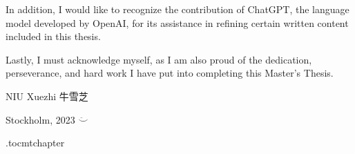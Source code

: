 In addition, I would like to recognize the contribution of ChatGPT, the language model developed by OpenAI, for its assistance in refining certain written content included in this thesis.

Lastly, I must acknowledge myself, as I am also proud of the dedication, perseverance, and hard work I have put into completing this Master's Thesis.

\vspace{2cm}
\hfill NIU Xuezhi 牛雪芝

\hfill Stockholm, \monthname{ }2023 $\ddot\smile$

\newpage



\newpage

\etocdepthtag.toc{mtchapter}

\tableofcontents
\thispagestyle{plain}
\newpage
